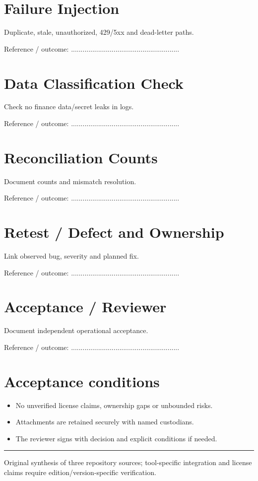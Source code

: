 \documentclass[10pt,letterpaper]{article}
\begin{document}
\section{Failure Injection}
Duplicate, stale, unauthorized, 429/5xx and dead-letter paths.\par
Reference / outcome: ........................................................\par
\section{Data Classification Check}
Check no finance data/secret leaks in logs.\par
Reference / outcome: ........................................................\par
\section{Reconciliation Counts}
Document counts and mismatch resolution.\par
Reference / outcome: ........................................................\par
\section{Retest / Defect and Ownership}
Link observed bug, severity and planned fix.\par
Reference / outcome: ........................................................\par
\section{Acceptance / Reviewer}
Document independent operational acceptance.\par
Reference / outcome: ........................................................\par
\section{Acceptance conditions}
\begin{itemize}
\item No unverified license claims, ownership gaps or unbounded risks.
\item Attachments are retained securely with named custodians.
\item The reviewer signs with decision and explicit conditions if needed.
\end{itemize}
\vfill\noindent\color{muted}\rule{\linewidth}{0.4pt}\par\scriptsize Original synthesis of three repository sources; tool-specific integration and license claims require edition/version-specific verification.\normalsize
\end{document}

